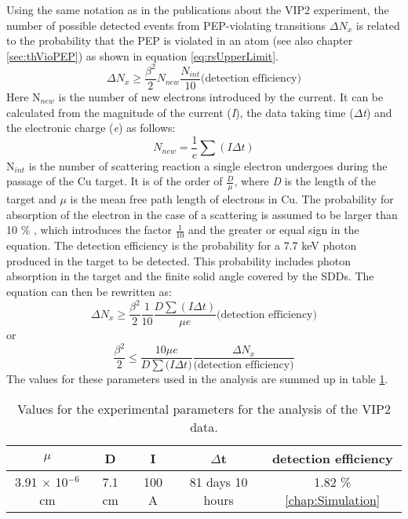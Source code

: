 Using the same notation as in the publications about the VIP2 experiment, the number of possible detected events from PEP-violating transitions $\Delta N_{x}$ is related to the probability that the PEP is violated in an atom \betatwo (see also chapter \ref{sec:thVioPEP}) as shown in equation \ref{eq:rsUpperLimit}.
\begin{equation}
 \Delta N_{x} \geq \frac{\beta^{2}}{2} N_{new} \frac{N_{int}}{10} \textrm{(detection efficiency)}
 \label{eq:rsUpperLimit}
\end{equation} 
Here N$_{new}$ is the number of new electrons introduced by the current. It can be calculated from the magnitude of the current (\textit{I}), the data taking time ($\Delta$\textit{t}) and the electronic charge (\textit{e}) as follows:
\begin{equation}
 N_{new} = \frac{1}{e} \sum{(I \Delta t)}
\end{equation} 
N$_{int}$ is the number of scattering reaction a single electron undergoes during the passage of the Cu target. It is of the order of $\frac{D}{\mu}$, where \textit{D} is the length of the target and $\mu$ is the mean free path length of electrons in Cu. The probability for absorption of the electron in the case of a scattering is assumed to be larger than 10 \% \cite{RAMBERG1990}, which introduces the factor $\frac{1}{10}$ and the greater or equal sign in the equation. The detection efficiency is the probability for a 7.7 keV photon produced in the target to be detected. This probability includes photon absorption in the target and the finite solid angle covered by the SDDs. The equation can then be rewritten as:
\begin{equation}
 \Delta N_{x} \geq \frac{\beta^{2}}{2} \frac{1}{10} \frac{D \sum{(I \Delta t)}}{\mu e} \textrm{(detection efficiency)}
\end{equation}
or 
\begin{equation}
 \frac{\beta^{2}}{2} \leq \frac{10 \mu e}{D \sum{(I \Delta t})} \frac{\Delta N_{x}}{\textrm{(detection efficiency)}}
 \label{eq:beta2_1}
\end{equation} 
The values for these parameters used in the analysis are summed up in table \ref{tab:expPara}.
%
\begin{table}[h]
 \centering
\begin{tabular}{ |c|c|c|c|c| } 
 \hline
  $\mu$ & D & I & $\Delta$t & detection efficiency\\ 
 \hline
  3.91 $\times$ 10$^{-6}$ cm\cite{Elliott2012} & 7.1 cm & 100 A & 81 days 10 hours & 1.82 \% \ref{chap:Simulation} \\
  \hline
\end{tabular}
\caption{Values for the experimental parameters for the analysis of the VIP2 data.}
\label{tab:expPara}
\end{table}
